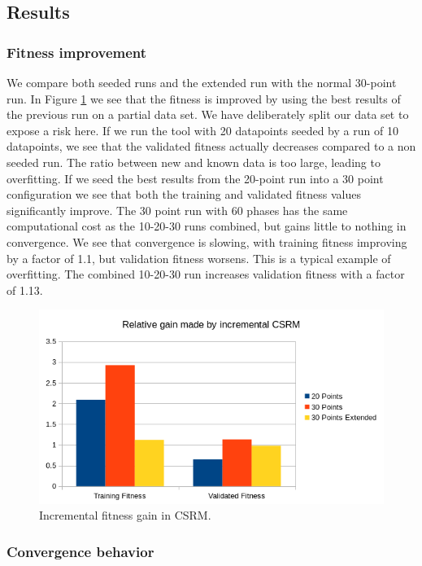 \subsection{Results}
\subsubsection{Fitness improvement}
We compare both seeded runs and the extended run with the normal 30-point run. In Figure \ref{fig:incrementalgain} we see that the fitness is improved by using the best results of the previous run on a partial data set. We have deliberately split our data set to expose a risk here. If we run the tool with 20 datapoints seeded by a run of 10 datapoints, we see that the validated fitness actually decreases compared to a non seeded run. The ratio between new and known data is too large, leading to overfitting. If we seed the best results from the 20-point run into a 30 point configuration we see that both the training and validated fitness values significantly improve. 
The 30 point run with 60 phases has the same computational cost as the 10-20-30 runs combined, but gains little to nothing in convergence. We see that convergence is slowing, with training fitness improving by a factor of 1.1, but validation fitness worsens. This is a typical example of overfitting. The combined 10-20-30 run increases validation fitness with a factor of 1.13.
\begin{figure}
    \centering
    \includegraphics[width=\textwidth,height=\textheight,keepaspectratio]{figures/incrementalgain.png}
    \caption{Incremental fitness gain in CSRM.}
    \label{fig:incrementalgain}
\end{figure}
\subsubsection{Convergence behavior}
